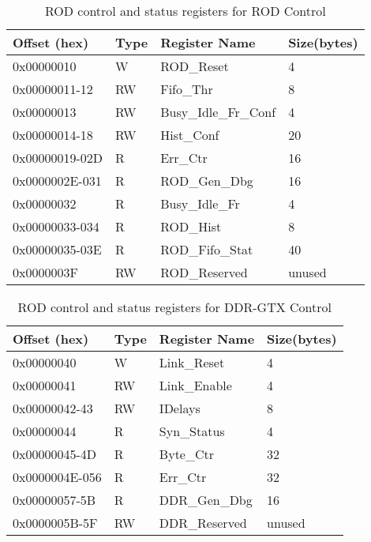 \begin {table}[H]
\begin{center}
\caption {ROD control and status registers for ROD Control}
\label{rod_control_rod}
\begin{tabular}{|l|l|l|l|}
\hline
Offset (hex)& Type & Register Name & Size(bytes)\\
\hline
0x00000010 & W & ROD\_Reset & 4 \\
\hline
0x00000011-12 & RW & Fifo\_Thr & 8 \\
\hline
0x00000013 & RW & Busy\_Idle\_Fr\_Conf & 4 \\
\hline
0x00000014-18 & RW & Hist\_Conf & 20 \\
\hline
0x00000019-02D & R & Err\_Ctr & 16 \\
\hline
0x0000002E-031 & R & ROD\_Gen\_Dbg & 16 \\
\hline
0x00000032 & R & Busy\_Idle\_Fr & 4 \\
\hline
0x00000033-034 & R & ROD\_Hist & 8 \\
\hline
0x00000035-03E & R & ROD\_Fifo\_Stat & 40 \\
\hline
0x0000003F & RW & ROD\_Reserved & unused \\
\hline
\end{tabular}
\end{center}
\end{table}


\begin {table}[H]
\begin{center}
\caption {ROD control and status registers for DDR-GTX Control}
\label{rod_control_ddrgtx}
\begin{tabular}{|l|l|l|l|}
\hline
Offset (hex)& Type & Register Name & Size(bytes)\\
\hline
0x00000040 & W & Link\_Reset & 4 \\
\hline
0x00000041 & RW & Link\_Enable & 4 \\
\hline
0x00000042-43 & RW & IDelays & 8 \\
\hline
0x00000044 & R & Syn\_Status & 4 \\
\hline
0x00000045-4D & R & Byte\_Ctr & 32 \\
\hline
0x0000004E-056 & R & Err\_Ctr & 32 \\
\hline
0x00000057-5B & R & DDR\_Gen\_Dbg & 16 \\
\hline
0x0000005B-5F & RW & DDR\_Reserved & unused \\
\hline
\end{tabular}
\end{center}
\end{table}


